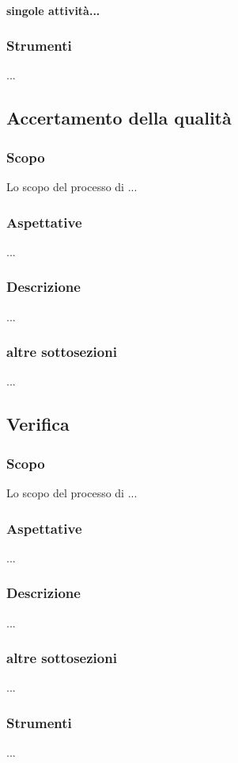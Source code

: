     \paragraph{singole attività...}
    \subsubsection{Strumenti}
    ...

\subsection{Accertamento della qualità}
    \subsubsection{Scopo}
        Lo scopo del processo di ...
    \subsubsection{Aspettative}
        ...
    \subsubsection{Descrizione}
        ...
    \subsubsection{altre sottosezioni}
        ...

\subsection{Verifica}
\label{verifica}
    \subsubsection{Scopo}
        Lo scopo del processo di ...
    \subsubsection{Aspettative}
        ...
    \subsubsection{Descrizione}
        ...
    \subsubsection{altre sottosezioni}
        ...
    \subsubsection{Strumenti}
        ...


